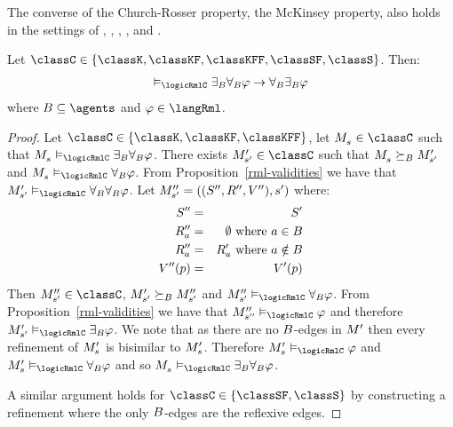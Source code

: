 The converse of the Church-Rosser property, the McKinsey property, also holds in the settings of \classK{}, \classKF{}, \classKFF{}, \classSF{}, and \classS{}.

\begin{proposition}\label{rml-church-rosser}
Let $\classC \in \{\classK, \classKF, \classKFF, \classSF, \classS\}$. Then:
$$
\begin{array}{l}
    \entails_\logicRmlC \somerefsBs \allrefsBs \phi \implies \allrefsBs \somerefsBs \phi
\end{array}
$$
where $\agentsB \subseteq \agents$ and $\phi \in \langRml$.
\end{proposition}

\begin{proof}
Let $\classC \in \{\classK, \classKF, \classKFF\}$, let $\kPModel{\kStateS} \in \classC$ such that $\kPModel{\kStateS} \entails_\logicRmlC\somerefsBs \allrefsBs \phi$.
There exists $\kPModelP{\kStateSP} \in \classC$ such that $\kPModel{\kStateS} \simulatesBs \kPModelP{\kStateSP}$ and $\kPModel{\kStateS} \entails_\logicRmlC\allrefsBs \phi$.
From Proposition~\ref{rml-validities} we have that $\kPModelP{\kStateSP} \entails_\logicRmlC\allrefsBs \allrefsBs \phi$.
Let $\kPModelAndTuplePP{\kStateSP}$ where:
\begin{eqnarray*}
    {S^{\prime\prime}} &=& {S^{\prime}}\\
    {R^{\prime\prime}_{a}} &=& \emptyset \text{ where } a \in B\\
    {R^{\prime\prime}_{a}} &=& {R^{\prime}_{a}} \text{ where } a \notin B\\
    {V^{\prime\prime}}(p) &=& {V^{\prime}}(p)
\end{eqnarray*}
Then $\kPModelPP{\kStateSP} \in \classC$, ${M^{\prime}_{{s}^{\prime}}} \succeq_{B} {M^{\prime\prime}_{{s}^{\prime}}}$ and $\kPModelPP{\kStateSP} \entails_\logicRmlC\allrefsBs \phi$.
From Proposition~\ref{rml-validities} we have that $\kPModelPP{\kStateSPP} \entails_\logicRmlC\phi$ and therefore $\kPModelP{\kStateSP} \entails_\logicRmlC\somerefsBs \phi$.
We note that as there are no $B$-edges in ${M^{\prime}_{}}$ then every refinement of $\kPModelP{\kStateS}$ is bisimilar to $\kPModelP{\kStateS}$.
Therefore $\kPModelP{\kStateS} \entails_\logicRmlC\phi$ and $\kPModelP{\kStateS} \entails_\logicRmlC\allrefsBs \phi$ and so $\kPModel{\kStateS} \entails_\logicRmlC\somerefsBs \allrefsBs \phi$.

A similar argument holds for $\classC \in \{\classSF, \classS\}$ by constructing a refinement where the only $B$-edges are the reflexive edges.
\end{proof}

